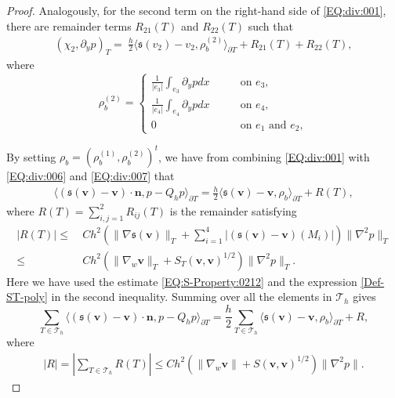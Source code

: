\documentclass[final,leqno]{siamltex704}
\def\S{{\mathfrak s}}
\def\T{{\mathcal T}}
\def\pT{{\partial T}}
\begin{document}
\begin{proof}
Analogously, for the second term on the right-hand side of \eqref{EQ:div:001}, there are remainder terms $R_{21}(T)$ and $R_{22}(T)$ such that
\begin{equation}\label{EQ:div:007}
\begin{split}
(\chi_2, \partial_y p)_T =\ \frac{h}{2} \langle \S(v_2) - v_2, \rho_b^{(2)}\rangle_\pT + R_{21}(T)+R_{22}(T),
\end{split}
\end{equation}
where
$$
\rho_b^{(2)}=\left\{
\begin{array}{rl}
\frac{1}{|e_3|} \int_{e_3} \partial_y p dx\qquad &\mbox{on } e_3,\\
\frac{1}{|e_4|} \int_{e_4} \partial_y p dx\qquad &\mbox{on } e_4,\\
0 \qquad &\mbox{on $e_1$ and $e_2$},
\end{array}
\right.
$$

By setting $\rho_b=(\rho_b^{(1)}, \rho_b^{(2)})^t$, we have from combining \eqref{EQ:div:001} with \eqref{EQ:div:006} and \eqref{EQ:div:007} that
\begin{equation}\label{EQ:div:008}
\begin{split}
 \langle(\S(\bm{v})-\bm{v})\cdot \bm{n},p- Q_h p\rangle_{\partial T}
=  \frac{h}{2} \langle \S(\bm{v}) - \bm{v}, \rho_b\rangle_\pT + R(T),
\end{split}
\end{equation}
where $R(T) = \sum_{i,j=1}^2 R_{ij}(T)$ is the remainder satisfying
\begin{equation}\label{EQ:div:009}
\begin{split}
|R(T)| \leq & \ C h^2 \left(\|\nabla \S(\bm{v})\|_T + \sum_{i=1}^4 |(\S(\bm{v})-\bm{v})(M_i)|\right) \|\nabla^2 p\|_T\\
\leq & \ C h^2 \left(\|\nabla_w \bm{v}\|_T + S_T(\bm{v}, \bm{v})^{1/2}\right) \|\nabla^2 p\|_T.
\end{split}
\end{equation}
Here we have used the estimate \eqref{EQ:S-Property:0212} and the expression \eqref{Def-ST-poly} in the second inequality.
Summing over all the elements in $\T_h$ gives
\begin{equation}\label{EQ:div:010}
\sum_{T\in\T_h} \langle(\S(\bm{v})-\bm{v})\cdot \bm{n},p- Q_h p\rangle_{\partial T}
=  \frac{h}{2} \sum_{T\in\T_h} \langle \S(\bm{v}) - \bm{v}, \rho_b\rangle_\pT + R,
\end{equation}
where
\begin{equation}\label{EQ:div:011}
\begin{split}
|R| = \left| \sum_{T\in\T_h} R(T) \right|
\leq C h^2 \left(\|\nabla_w\bm{v}\| + S(\bm{v}, \bm{v})^{1/2}\right) \|\nabla^2 p\|.
\end{split}
\end{equation}


\end{proof}
\end{document}
